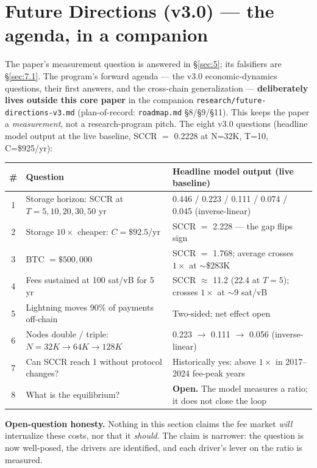 \documentclass[11pt]{article}
\begin{document}
\section{Future Directions (v3.0) --- the agenda, in a companion}\label{sec:10}
The paper's measurement question is answered in \S\ref{sec:5}; its falsifiers are \S\ref{sec:7.1}. The program's forward agenda --- the v3.0 economic-dynamics questions, their first answers, and the cross-chain generalization --- \textbf{deliberately lives outside this core paper} in the companion \texttt{research/future-directions-v3.md} (plan-of-record: \texttt{roadmap.md} \S8/\S9/\S11). This keeps the paper a \emph{measurement}, not a research-program pitch. The eight v3.0 questions (headline model output at the live baseline, SCCR $=$ 0.2228 at N=32K, T=10, C=\$925/yr):
\begin{center}
\renewcommand{\arraystretch}{1.2}
\begin{tabular}{cll}
\toprule
\# & Question & Headline model output (live baseline) \\
\midrule
1 & Storage horizon: SCCR at $T = 5, 10, 20, 30, 50$ yr & 0.446 / 0.223 / 0.111 / 0.074 / 0.045 (inverse-linear) \\
2 & Storage $10\times$ cheaper: $C = \$92.5$/yr & SCCR $=$ 2.228 --- the gap flips sign \\
3 & BTC $= \$500{,}000$ & SCCR $=$ 1.768; average crosses $1\times$ at $\sim$\$283K \\
4 & Fees sustained at 100 sat/vB for 5 yr & SCCR $\approx$ 11.2 (22.4 at $T{=}5$); crosses $1\times$ at $\sim$9 sat/vB \\
5 & Lightning moves 90\% of payments off-chain & Two-sided; net effect open \\
6 & Nodes double / triple: $N = 32K \to 64K \to 128K$ & 0.223 $\to$ 0.111 $\to$ 0.056 (inverse-linear) \\
7 & Can SCCR reach 1 without protocol changes? & Historically yes: above $1\times$ in 2017--2024 fee-peak years \\
8 & What is the equilibrium? & \textbf{Open.} The model measures a ratio; it does not close the loop \\
\bottomrule
\end{tabular}
\end{center}
\textbf{Open-question honesty.} Nothing in this section claims the fee market \emph{will} internalize these costs, nor that it \emph{should}. The claim is narrower: the question is now well-posed, the drivers are identified, and each driver's lever on the ratio is measured.
\end{document}
